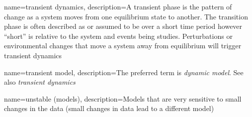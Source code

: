 {
	name=transient dynamics,
	description=A transient phase is the pattern of change as a system moves from one equilibrium state to another.  The transition phase is often described as\comma{} or assumed to be\comma{} over a short time period\comma{} however\comma{} ``short'' is relative to the system and events being studies.  Perturbations or environmental changes that move a system away from equilibrium will trigger transient dynamics
}

{
	name=transient model,
	description=The preferred term is \textit{dynamic model}.  See also \emph{transient dynamics}
}


{
    name=unstable (models),
    description=Models that are very sensitive to small changes in the data (small changes in data lead to a different model)
}

